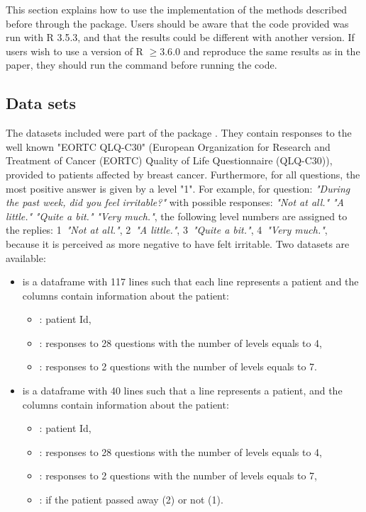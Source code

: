 This section explains how to use the implementation of the methods described before through the  package. Users should be aware that the code provided was run with R 3.5.3, and that the results could be different with another version. If users wish to use a version of R $\geq 3.6.0$ and reproduce the same results as in the paper, they should run the command  before running the code.


\subsection{Data sets}
The datasets included were part of the  package \citep{Anota17}. They contain responses to the well known "EORTC QLQ-C30" (European Organization for Research and Treatment of Cancer (EORTC) Quality of Life Questionnaire (QLQ-C30)), provided to patients affected by breast cancer. Furthermore, for all questions, the most positive answer is given by a level "1". For example, for question: \textit{"During the past week, did you feel irritable?"} with possible responses: \textit{"Not at all."} \textit{"A little."} \textit{"Quite a bit."} \textit{"Very much."}, the following level numbers are assigned to the replies: 1~\textit{"Not at all."}, 2~\textit{"A little."}, 3~\textit{"Quite a bit."}, 4~\textit{"Very much."}, because it is perceived as more negative to have felt irritable. Two datasets are available: 

\begin{itemize}
\item {} is a dataframe with 117 lines such that each line represents a patient and the columns contain information about the patient:
  \begin{itemize}
  \item {}: patient Id,
  \item {}: responses to 28 questions with the number of levels equals to 4,
  \item {}: responses to 2 questions with the number of levels equals to 7.
  \end{itemize}
\item {} is a dataframe with 40 lines such that a line represents a patient, and the columns contain information about the patient:
  \begin{itemize}
  \item {}: patient Id,
  \item {}: responses to 28 questions with the number of levels equals to 4,
  \item {}: responses to 2 questions with the number of levels equals to 7,
  \item {}: if the patient passed away (2) or not (1).
  \end{itemize}
\end{itemize}

